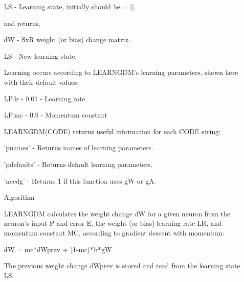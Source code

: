        LS - Learning state, initially should be = [].

     and returns,

       dW - SxR weight (or bias) change matrix.

       LS - New learning state.

     Learning occurs according to LEARNGDM's learning parameters,
     shown here with their default values.

       LP.lr - 0.01 - Learning rate

       LP.mc - 0.9  - Momentum constant

     LEARNGDM(CODE) returns useful information for each CODE string:

       'pnames'    - Returns names of learning parameters.

       'pdefaults' - Returns default learning parameters.

       'needg'     - Returns 1 if this function uses gW or gA.

   Algorithm

     LEARNGDM calculates the weight change dW for a given neuron
     from the neuron's input P and error E, the weight (or bias)
     learning rate LR, and momentum constant MC, according to
     gradient descent with momentum:

       dW = mc*dWprev + (1-mc)*lr*gW

     The previous weight change dWprev is stored and read
     from the learning state LS.
